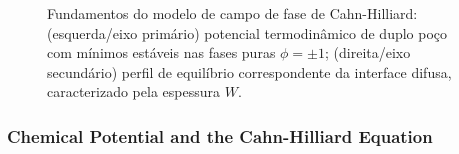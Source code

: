 \begin{figure}[H]
    \centering
    \caption{Fundamentos do modelo de campo de fase de Cahn-Hilliard: (esquerda/eixo primário) potencial termodinâmico de duplo poço com mínimos estáveis nas fases puras $\phi=\pm 1$; (direita/eixo secundário) perfil de equilíbrio correspondente da interface difusa, caracterizado pela espessura $W$.}
    \label{fig:cahn-hilliard-double-well}
\end{figure}

\subsubsection{Chemical Potential and the Cahn-Hilliard Equation}


